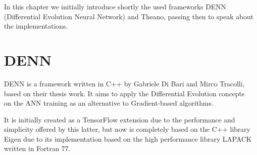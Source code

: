 In this chapter we initially introduce shortly the used frameworks DENN (Differential Evolution Neural Network) and Theano, passing then to speak about the implementations.

\section{DENN}\label{sec:DENN}
DENN is a framework written in C++ by Gabriele Di Bari and Mirco Tracolli, based on their thesis work. It aims to apply the Differential Evolution concepts on the ANN training as an alternative to Gradient-based algorithms. 

It is initially created as a TensorFlow extension due to the performance and simplicity offered by this latter, but now is completely based on the C++ library Eigen due to its implementation based on the high performance library LAPACK written in Fortran 77.

